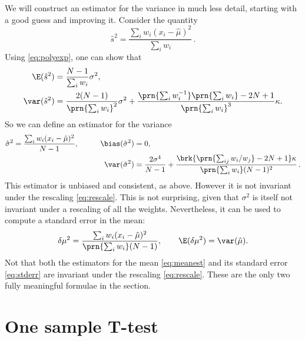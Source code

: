 \documentclass[12pt]{article}
\newcommand{\mh}{\hat\mu}
\newcommand{\sh}{\hat{s}}
\newcommand{\sih}{\hat{\sigma}}
\begin{document}
We will construct an estimator for the variance in much less detail, starting with a good guess and improving it. Consider the quantity
%
\begin{equation}\label{eq:varestguess}
  \sh^2 = \frac{\sum_i w_i (x_i-\mh)^2}{\sum_i w_i}\,.
\end{equation}
%
Using \eqref{eq:polyexp}, one can show that
%
\begin{equation}\label{eq:varestmoments}
 \begin{aligned}
  \E(\sh^2) &= \frac{N-1}{\sum_i w_i} \sigma^2, \\
  \var(\sh^2) &= \frac{2(N-1)}{\prn{\sum_i w_i}^2} \sigma^2 + \frac{\prn{\sum_i w_i^{-1}}\prn{\sum_i w_i} - 2N + 1}{\prn{\sum_i w_i}^3}\kappa.
 \end{aligned}
\end{equation}
%
So we can define an estimator for the variance
%
\begin{equation}\label{eq:varest}
 \begin{aligned}
  \sih^2 &= \frac{\sum_i w_i (x_i-\mh)^2}{N-1}, \qquad&
  \bias(\sih^2) &= 0, \\ & &
  \var(\sih^2) &= \frac{2\sigma^4}{N-1} + \frac{\brk{\prn{\sum_{ij} w_i/w_j} - 2N + 1}\kappa}{\prn{\sum_i w_i}(N-1)^2}\,.
 \end{aligned}
\end{equation}
%
This estimator is unbiased and consistent, as above. However it is not invariant under the rescaling \eqref{eq:rescale}. This is not surprising, given that $\sigma^2$ is itself not invariant under a rescaling of all the weights. Nevertheless, it can be used to compute a standard error in the mean:
%
\begin{equation}\label{eq:stderr}
  \delta\mu^2 = \frac{\sum_i w_i (x_i-\mh)^2}{\prn{\sum_i w_i}(N-1)}, \qquad
  \E(\delta\mu^2) = \var(\mh).
\end{equation}
%
Not that both the estimators for the mean \eqref{eq:meanest} and its standard error \eqref{eq:stderr} are invariant under the rescaling \eqref{eq:rescale}. These are the only two fully meaningful formulae in the section.

\section{One sample T-test}\label{sec:ttestone}
\end{document}

